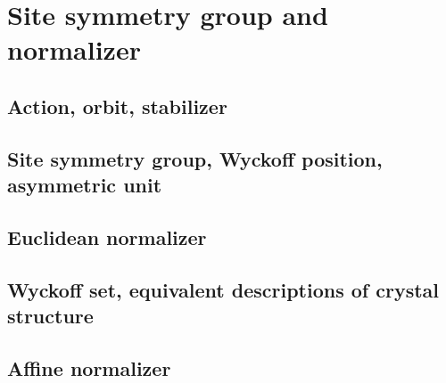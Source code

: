 \section{\label{sec:normalizer}Site symmetry group and normalizer}

\subsection{Action, orbit, stabilizer}

\subsection{Site symmetry group, Wyckoff position, asymmetric unit}

\subsection{Euclidean normalizer}

\subsection{Wyckoff set, equivalent descriptions of crystal structure}

\subsection{Affine normalizer}
